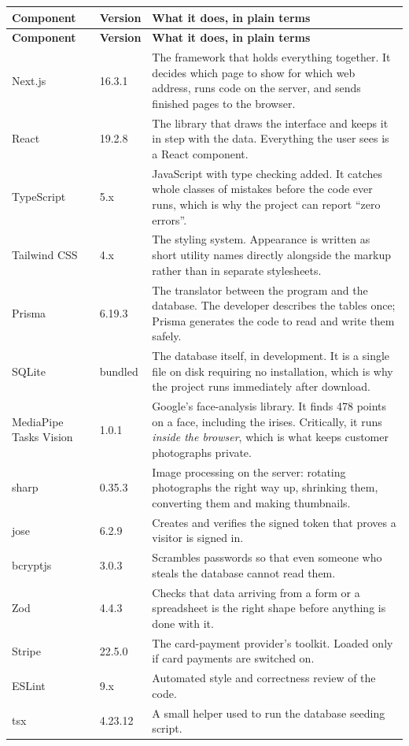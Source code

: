\documentclass[11pt,a4paper]{report}
\begin{document}
\begin{longtable}{@{}p{}p{}p{}@{}}
\toprule
\textbf{Component} & \textbf{Version} & \textbf{What it does, in plain terms}\\
\midrule
\endfirsthead
\toprule
\textbf{Component} & \textbf{Version} & \textbf{What it does, in plain terms}\\
\midrule
\endhead
Next.js & 16.3.1 &
The framework that holds everything together. It decides which page to show
for which web address, runs code on the server, and sends finished pages to
the browser.\\
\addlinespace
React & 19.2.8 &
The library that draws the interface and keeps it in step with the data.
Everything the user sees is a React component.\\
\addlinespace
TypeScript & 5.x &
JavaScript with type checking added. It catches whole classes of mistakes
before the code ever runs, which is why the project can report ``zero
errors''.\\
\addlinespace
Tailwind CSS & 4.x &
The styling system. Appearance is written as short utility names directly
alongside the markup rather than in separate stylesheets.\\
\addlinespace
Prisma & 6.19.3 &
The translator between the program and the database. The developer describes
the tables once; Prisma generates the code to read and write them safely.\\
\addlinespace
SQLite & bundled &
The database itself, in development. It is a single file on disk requiring no
installation, which is why the project runs immediately after download.\\
\addlinespace
MediaPipe Tasks Vision & 1.0.1 &
Google's face-analysis library. It finds 478 points on a face, including the
irises. Critically, it runs \emph{inside the browser}, which is what keeps
customer photographs private.\\
\addlinespace
sharp & 0.35.3 &
Image processing on the server: rotating photographs the right way up,
shrinking them, converting them and making thumbnails.\\
\addlinespace
jose & 6.2.9 &
Creates and verifies the signed token that proves a visitor is signed in.\\
\addlinespace
bcryptjs & 3.0.3 &
Scrambles passwords so that even someone who steals the database cannot read
them.\\
\addlinespace
Zod & 4.4.3 &
Checks that data arriving from a form or a spreadsheet is the right shape
before anything is done with it.\\
\addlinespace
Stripe & 22.5.0 &
The card-payment provider's toolkit. Loaded only if card payments are switched
on.\\
\addlinespace
ESLint & 9.x &
Automated style and correctness review of the code.\\
\addlinespace
tsx & 4.23.12 &
A small helper used to run the database seeding script.\\
\bottomrule
\end{longtable}
\end{document}
